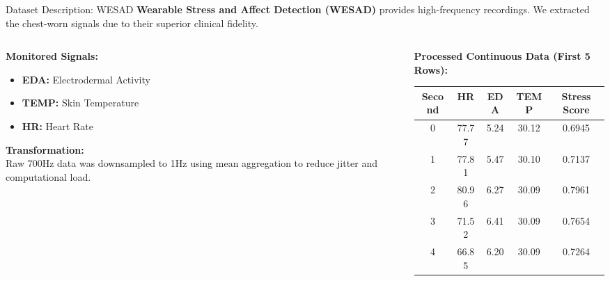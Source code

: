 \documentclass[aspectratio=169, xcolor={dvipsnames,table}]{beamer}
\begin{document}
\begin{frame}{Dataset Description: WESAD}
\textbf{Wearable Stress and Affect Detection (WESAD)} provides high-frequency recordings. We extracted the chest-worn signals due to their superior clinical fidelity.
\vspace{0.4cm}

\begin{columns}
    \begin{column}{0.35\textwidth}
        \textbf{Monitored Signals:}
        \begin{itemize}
            \item \textbf{EDA:} Electrodermal Activity
            \item \textbf{TEMP:} Skin Temperature
            \item \textbf{HR:} Heart Rate
        \end{itemize}
        \vspace{0.2cm}
        \textbf{Transformation:}\\
        Raw 700Hz data was downsampled to 1Hz using mean aggregation to reduce jitter and computational load.
    \end{column}
    \begin{column}{0.6\textwidth}
        \textbf{Processed Continuous Data (First 5 Rows):}
        \begin{table}
            \small
            \begin{tabular}{ccccc}
                \toprule
                \rowcolor{Navy!10} \textbf{Second} & \textbf{HR} & \textbf{EDA} & \textbf{TEMP} & \textbf{Stress Score} \\
                \midrule
                0 & 77.77 & 5.24 & 30.12 & 0.6945 \\
                1 & 77.81 & 5.47 & 30.10 & 0.7137 \\
                2 & 80.96 & 6.27 & 30.09 & 0.7961 \\
                3 & 71.52 & 6.41 & 30.09 & 0.7654 \\
                4 & 66.85 & 6.20 & 30.09 & 0.7264 \\
                \bottomrule
            \end{tabular}
        \end{table}
    \end{column}
\end{columns}
\end{frame}
\end{document}
